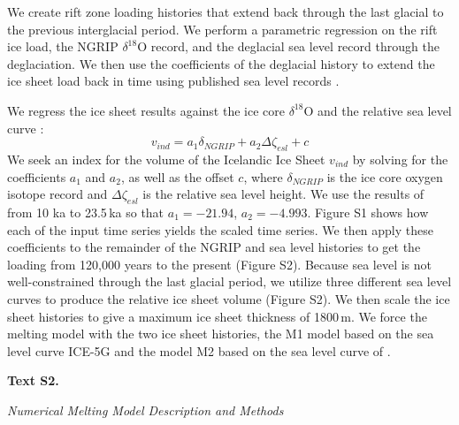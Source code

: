\documentclass[draft,grl]{agutexSI2018}
\begin{document}
\begin{article}
We create rift zone loading histories that extend back through the last glacial to the previous interglacial period. We perform a parametric regression on the rift ice load, the NGRIP $\delta^{18}$O record, and the deglacial sea level record through the deglaciation. We then use the coefficients of the deglacial history to extend the ice sheet load back in time using published sea level records \citep{peltier-2004,pico-etal-2017}.

We regress the ice sheet results against the ice core $\delta^{18}$O \citep{lambeck-2001} and the relative sea level curve \citep{spratt-2016}:
\begin{equation}
v_{ind} = a_{1} \delta_{NGRIP} + a_{2} \Delta\zeta_{esl} + c
\label{eq:1}
\end{equation}
We seek an index for the volume of the Icelandic Ice Sheet $v_{ind}$ by solving for the coefficients $a_{1}$ and $a_{2}$, as well as the offset $c$, where $\delta_{NGRIP}$ is the ice core oxygen isotope record and  $\Delta\zeta_{esl}$ is the relative sea level height. We use the results of \citet{patton-etal-2017} from 10 ka to 23.5\,ka so that $a_{1} = -21.94$, $a_{2} = -4.993$. Figure S1 shows how each of the input time series yields the scaled time series. We then apply these coefficients to the remainder of the NGRIP and sea level histories to get the loading from 120,000 years to the present (Figure S2). Because sea level is not well-constrained through the last glacial period, we utilize three different sea level curves to produce the relative ice sheet volume (Figure S2). We then scale the ice sheet histories to give a maximum ice sheet thickness of 1800\,m. We force the melting model with the two ice sheet histories, the M1 model based on the sea level curve ICE-5G \citep{peltier-2004} and the model M2 based on the sea level curve of \citet{pico-etal-2017}.

\noindent\textbf{Text S2.}

\noindent\textit{Numerical Melting Model Description and Methods}


\end{article}
\end{document}

